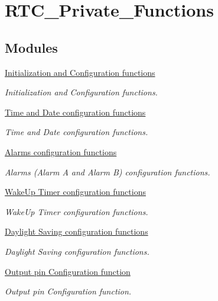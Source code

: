 \hypertarget{group___r_t_c___private___functions}{\section{R\-T\-C\-\_\-\-Private\-\_\-\-Functions}
\label{group___r_t_c___private___functions}
}
\subsection*{Modules}
\begin{DoxyCompactItemize}
\item 
\hyperlink{group___r_t_c___group1}{Initialization and Configuration functions}
\begin{DoxyCompactList}\small\item\em Initialization and Configuration functions. \end{DoxyCompactList}\item 
\hyperlink{group___r_t_c___group2}{Time and Date configuration functions}
\begin{DoxyCompactList}\small\item\em Time and Date configuration functions. \end{DoxyCompactList}\item 
\hyperlink{group___r_t_c___group3}{Alarms configuration functions}
\begin{DoxyCompactList}\small\item\em Alarms (Alarm A and Alarm B) configuration functions. \end{DoxyCompactList}\item 
\hyperlink{group___r_t_c___group4}{Wake\-Up Timer configuration functions}
\begin{DoxyCompactList}\small\item\em Wake\-Up Timer configuration functions. \end{DoxyCompactList}\item 
\hyperlink{group___r_t_c___group5}{Daylight Saving configuration functions}
\begin{DoxyCompactList}\small\item\em Daylight Saving configuration functions. \end{DoxyCompactList}\item 
\hyperlink{group___r_t_c___group6}{Output pin Configuration function}
\begin{DoxyCompactList}\small\item\em Output pin Configuration function. \end{DoxyCompactList}\item 

\end{DoxyCompactItemize}
